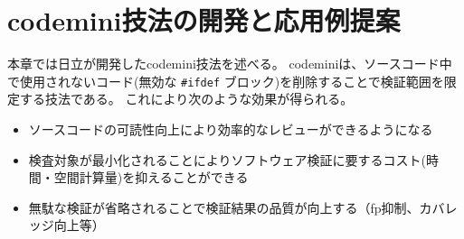 \section{\acrshort{codemini}技法の開発と応用例提案}
\label{mini}
本章では日立が開発した\acrshort{codemini}技法を述べる。
\acrshort{codemini}は、ソースコード中で使用されないコード(無効な \verb|#ifdef| ブロック)を削除することで検証範囲を限定する技法である。
これにより次のような効果が得られる。
\begin{itemize}
  \item ソースコードの可読性向上により効率的なレビューができるようになる
  \item 検査対象が最小化されることによりソフトウェア検証に要するコスト(時間・空間計算量)を抑えることができる
  \item 無駄な検証が省略されることで検証結果の品質が向上する（\acrshort{fp}抑制、カバレッジ向上等）
\end{itemize}
